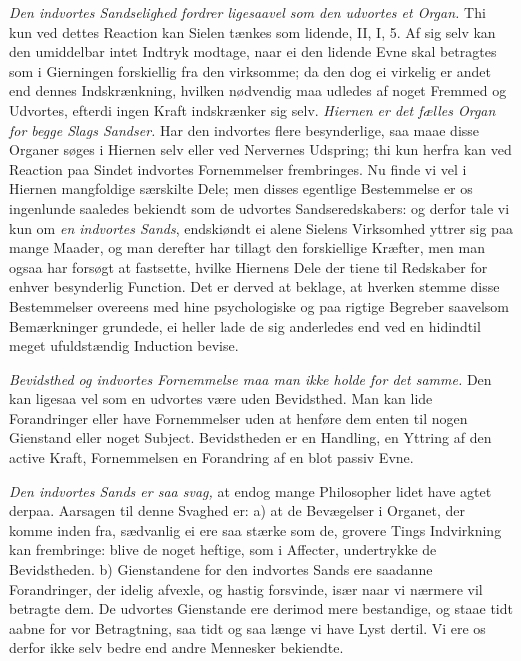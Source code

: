 \documentclass[12pt,a4paper]{article}
\newcommand{\opage}[1]{\marginnote{\footnotesize\textit{[#1]}}}
\begin{document}
\emph{Den indvortes Sandselighed fordrer ligesaavel som den udvortes et Organ.} Thi kun
ved dettes Reaction kan Sielen tænkes som lidende, II, I, 5. Af sig selv kan den
umiddelbar intet Indtryk modtage, naar ei den lidende Evne skal betragtes som i
Gierningen forskiellig fra den virksomme; da den dog ei virkelig er andet end dennes
Indskrænkning, hvilken nødvendig maa udledes af noget Fremmed og Udvortes, efterdi
ingen Kraft indskrænker sig selv. \emph{Hiernen er det fælles Organ for begge Slags
Sandser.} Har den indvortes flere besynderlige, saa maae disse Organer søges i Hiernen
selv eller ved Nervernes Udspring; thi kun herfra kan ved Reaction paa Sindet indvortes
Fornemmelser frembringes. Nu finde vi vel i Hiernen mangfoldige særskilte Dele; men
disses egentlige Bestemmelse er os ingenlunde saaledes bekiendt som de udvortes
Sandseredskabers: og derfor tale vi kun om \emph{en indvortes Sands}, endskiøndt ei
alene Sielens Virksomhed yttrer sig paa mange Maader, og man derefter har tillagt den
forskiellige Kræfter, men man ogsaa har forsøgt at fastsette, hvilke Hiernens Dele der
tiene til Redskaber for enhver besynderlig Function. Det er derved at beklage, at
hverken stemme disse Bestemmelser overeens med hine psychologiske og paa rigtige
Begreber saavelsom Bemærkninger grundede, ei heller
\opage{77} lade de sig anderledes end ved en hidindtil meget ufuldstændig Induction bevise.

\emph{Bevidsthed og indvortes Fornemmelse maa man ikke holde for det samme.} Den kan
ligesaa vel som en udvortes være uden Bevidsthed. Man kan lide Forandringer eller have
Fornemmelser uden at henføre dem enten til nogen Gienstand eller noget Subject.
Bevidstheden er en Handling, en Yttring af den active Kraft, Fornemmelsen en
Forandring af en blot passiv Evne.

\emph{Den indvortes Sands er saa svag,} at endog mange Philosopher lidet have agtet
derpaa. Aarsagen til denne Svaghed er: a) at de Bevægelser i Organet, der komme inden
fra, sædvanlig ei ere saa stærke som de, grovere Tings Indvirkning kan frembringe:
blive de noget heftige, som i Affecter, undertrykke de Bevidstheden. b) Gienstandene
for den indvortes Sands ere saadanne Forandringer, der idelig afvexle, og hastig
forsvinde, især naar vi nærmere vil betragte dem. De udvortes Gienstande ere derimod
mere bestandige, og staae tidt aabne for vor Betragtning, saa tidt og saa længe vi have
Lyst dertil. Vi ere os derfor ikke selv bedre end andre Mennesker bekiendte.
\end{document}
